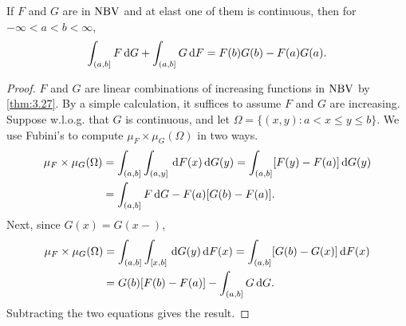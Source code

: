 \documentclass[12pt]{article} %
\begin{document}
\begin{theorem}
    If $F$ and $G$ are in $\operatorname{NBV}$ and at elast one of them is continuous, then for $-\infty < a < b < \infty$, \[\int_{(a, b]}F \, \mathrm{d} G + \int_{(a, b]}G \, \mathrm{d} F = F(b)G(b) - F(a)G(a).\]
\end{theorem}

\begin{proof}
    $F$ and $G$ are linear combinations of increasing functions in $\operatorname{NBV}$ by \cref{thm:3.27}. By a simple calculation, it suffices to assume $F$ and $G$ are increasing.  Suppose w.l.o.g. that $G$ is continuous, and let $\Omega = \{(x, y) : a < x \leq y \leq b\}$. We use Fubini's to compute $\mu_F \times \mu_G(\Omega)$ in two ways. \begin{align*}
        \mu_F \times \mu_G(\Omega) &= \int_{(a, b]}\int_{(a, y]} \, \mathrm{d} F(x) \, \mathrm{d} G(y) = \int_{(a, b]} [F(y) - F(a)] \, \mathrm{d} G(y)\\
        &= \int_{(a, b]}F \, \mathrm{d} G - F(a)[G(b) - F(a)].
    \end{align*}
    Next, since $G(x) = G(x-)$, \begin{align*}
        \mu_F \times \mu_G(\Omega) &= \int_{(a, b]}\int_{[x, b]}\, \mathrm{d} G(y) \, \mathrm{d} F(x) = \int_{(a,b]} [G(b) - G(x)] \, \mathrm{d} F(x)\\
        &= G(b)[F(b) - F(a)] - \int_{(a,b]}G \, \mathrm{d} G.
    \end{align*}
    Subtracting the two equations gives the result.
\end{proof}





\pagebreak

\small



\end{document}
